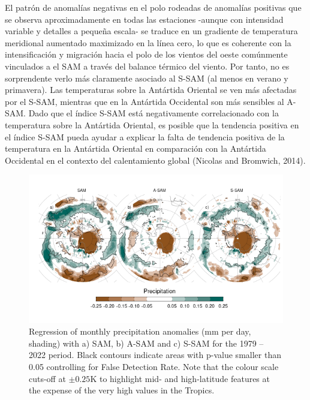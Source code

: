 \documentclass[12pt,oneside]{reedthesis}
\begin{document}
El patrón de anomalías negativas en el polo rodeadas de anomalías positivas que se observa aproximadamente en todas las estaciones -aunque con intensidad variable y detalles a pequeña escala- se traduce en un gradiente de temperatura meridional aumentado maximizado en la línea cero, lo que es coherente con la intensificación y migración hacia el polo de los vientos del oeste comúnmente vinculados a el SAM a través del balance térmico del viento.
Por tanto, no es sorprendente verlo más claramente asociado al S-SAM (al menos en verano y primavera).
Las temperaturas sobre la Antártida Oriental se ven más afectadas por el S-SAM, mientras que en la Antártida Occidental son más sensibles al A-SAM.
Dado que el índice S-SAM está negativamente correlacionado con la temperatura sobre la Antártida Oriental, es posible que la tendencia positiva en el índice S-SAM pueda ayudar a explicar la falta de tendencia positiva de la temperatura en la Antártida Oriental en comparación con la Antártida Occidental en el contexto del calentamiento global (Nicolas and Bromwich, 2014).



\begin{figure}
\includegraphics{figures/30-sam/global-pp-1} \caption{Regression of monthly precipitation anomalies (mm per day, shading) with a) SAM, b) A-SAM and c) S-SAM for the 1979 -- 2022 period. Black contours indicate areas with p-value smaller than 0.05 controlling for False Detection Rate. Note that the colour scale cuts-off at \(\pm0.25 \mathrm{K}\) to highlight mid- and high-latitude features at the expense of the very high values in the Tropics.}\label{fig:global-pp}
\end{figure}
\end{document}
